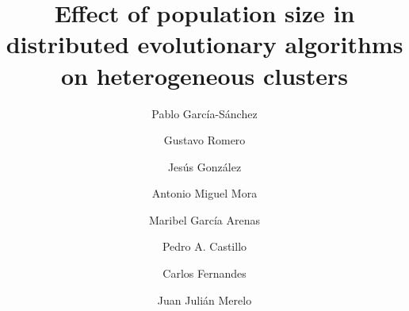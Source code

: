 \documentclass[final,1p,times]{elsarticle}
\begin{document}
\begin{frontmatter}



\title{Effect of population size in distributed evolutionary algorithms on heterogeneous clusters}


\author[ugr]{Pablo Garc\'ia-S\'anchez}
\author[ugr]{Gustavo Romero}
\author[ugr]{Jes\'us Gonz\'alez}
\author[ugr]{Antonio Miguel Mora}
\author[ugr]{Maribel Garc\'ia Arenas}
\author[ugr]{Pedro A. Castillo}
\author[laseeb]{Carlos Fernandes}
\author[ugr]{Juan Juli\'an Merelo}


\address[ugr]{Department of Computer Architecture and Computer Technology and CITIC-UGR, University of Granada, Granada, Spain. Tel: +34958241778. Fax: +34958248993}
\address[laseeb]{LaSEEB-ISR-IST, Technical University of Lisbon (IST), Lisbon, Portugal}%



\end{frontmatter}
\end{document}
